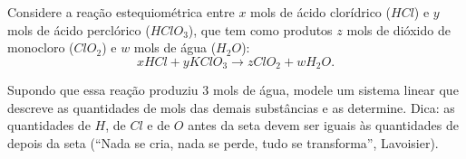 \begin{ex}
Considere a reação estequiométrica entre $x$ mols de ácido clorídrico ($HCl$) e $y$ mols de ácido
perclórico ($HClO_3$), que tem como produtos $z$ mols de dióxido de monocloro ($ClO_2$) e $w$
mols de água ($H_2O$):
$$xHCl+yKClO_3\rightarrow zClO_2+wH_2O.$$


Supondo que essa reação produziu $3$ mols de água, modele um sistema linear que descreve
as quantidades de mols das demais substâncias e as determine. Dica: as quantidades de $H$, de $Cl$ e
de $O$ antes da seta devem ser iguais às quantidades de depois da seta (``Nada se cria, nada
se perde, tudo se transforma'', Lavoisier).
\label{ex.quimica}\end{ex}

%








%